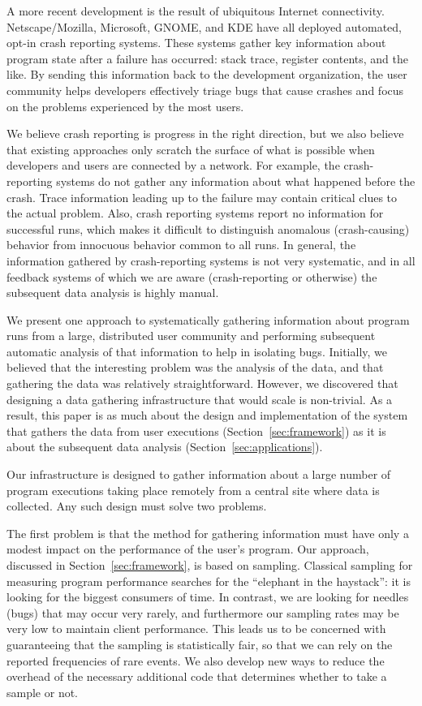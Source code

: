 A more recent development is the result of ubiquitous Internet
connectivity.  Netscape/Mozilla, Microsoft, GNOME, and KDE have all
deployed automated, opt-in crash reporting systems.  These systems
gather key information about program state after a failure has
occurred: stack trace, register contents, and the like.  By sending
this information back to the development organization, the user
community helps developers effectively triage bugs that cause crashes
and focus on the problems experienced by the most users.

We believe crash reporting is progress in the right direction, but we
also believe that existing approaches only scratch the surface of what
is possible when developers and users are connected by a network.  For
example, the crash-reporting systems do not gather any information
about what happened before the crash.  Trace information leading up to
the failure may contain critical clues to the actual problem.  Also,
crash reporting systems report no information for successful runs,
which makes it difficult to distinguish anomalous (crash-causing)
behavior from innocuous behavior common to all runs.  In general, the
information gathered by crash-reporting systems is not very
systematic, and in all feedback systems of which we are aware
(crash-reporting or otherwise) the subsequent data analysis is highly
manual.

We present one approach to systematically gathering information about
program runs from a large, distributed user community and performing
subsequent automatic analysis of that information to help in isolating
bugs.  Initially, we believed that the interesting problem was the
analysis of the data, and that gathering the data was relatively
straightforward.  However, we discovered that designing a data
gathering infrastructure that would scale is non-trivial.  As a
result, this paper is as much about the design and implementation of
the system that gathers the data from user executions
(Section~\ref{sec:framework}) as it is about the subsequent data
analysis (Section~\ref{sec:applications}).

Our infrastructure is designed to gather information about a large
number of program executions taking place remotely from a central site
where data is collected.  Any such design must solve two problems.

The first problem is that the method for gathering information must
have only a modest impact on the performance of the user's program.
Our approach, discussed in Section~\ref{sec:framework}, is based on
sampling.  Classical sampling for measuring program performance
searches for the ``elephant in the haystack'': it is looking for the
biggest consumers of time.  In contrast, we are looking for needles
(bugs) that may occur very rarely, and furthermore our sampling rates
may be very low to maintain client performance.  This leads us to be
concerned with guaranteeing that the sampling is statistically fair,
so that we can rely on the reported frequencies of rare events.  We
also develop new ways to reduce the overhead of the necessary
additional code that determines whether to take a sample or not.

